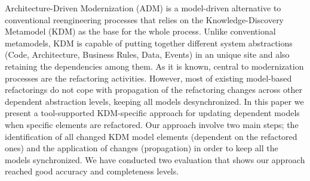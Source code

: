 %
Architecture-Driven Modernization (ADM) is a model-driven alternative to conventional reengineering processes that relies on the Knowledge-Discovery Metamodel (KDM) as the base for the whole process. Unlike conventional metamodels, KDM is capable of putting together different system abstractions (Code, Architecture, Business Rules, Data, Events) in an unique site and also retaining the dependencies among them. As it is known, central to modernization processes are the refactoring activities. However, most of existing model-based refactorings do not cope with propagation of the refactoring changes across other dependent abstraction levels, keeping all models desynchronized. In this paper we present a tool-supported KDM-specific approach for updating dependent models when specific elements are refactored. Our approach involve two main steps; the identification of all changed KDM model elements (dependent on the refactored ones) and the application of changes (propagation) in order to keep all the models synchronized. We have conducted two evaluation that shows our approach reached good accuracy and completeness levels.



